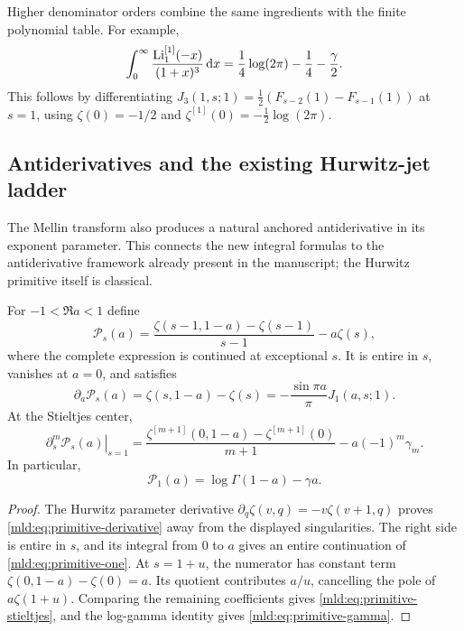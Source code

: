 Higher denominator orders combine the same ingredients with the finite polynomial table. For example,
\begin{equation}\label{mld:eq:third-pole-example}
 \int_0^\infty\frac{\operatorname{Li}_1^{[1]}(-x)}{(1+x)^3}\,\mathrm{d} x
       =\frac14\log(2\pi)-\frac14-\frac\gamma2.
\end{equation}
This follows by differentiating
$J_3(1,s;1)=\tfrac12(F_{s-2}(1)-F_{s-1}(1))$
at $s=1$, using $\zeta(0)=-1/2$ and
$\zeta^{[1]}(0)=-\tfrac12\log(2\pi)$.

\subsection{Antiderivatives and the existing Hurwitz-jet ladder}

The Mellin transform also produces a natural anchored antiderivative in its exponent parameter. This connects the new integral formulas to the antiderivative framework already present in the manuscript; the Hurwitz primitive itself is classical.

\begin{proposition}\label{mld:prop:primitive}
For $-1<\Re a<1$ define
\begin{equation}\label{mld:eq:primitive-one}
 \mathcal P_s(a)=
 \frac{\zeta(s-1,1-a)-\zeta(s-1)}{s-1}-a\zeta(s),
\end{equation}
where the complete expression is continued at exceptional $s$. It is entire in $s$, vanishes at $a=0$, and satisfies
\begin{equation}\label{mld:eq:primitive-derivative}
 \partial_a\mathcal P_s(a)
   =\zeta(s,1-a)-\zeta(s)
   =-\frac{\sin\pi a}{\pi}J_1(a,s;1).
\end{equation}
At the Stieltjes center,
\begin{equation}\label{mld:eq:primitive-stieltjes}
 \left.\partial_s^m\mathcal P_s(a)\right|_{s=1}
   =\frac{\zeta^{[m+1]}(0,1-a)-\zeta^{[m+1]}(0)}{m+1}
         -a(-1)^m\gamma_m.
\end{equation}
In particular,
\begin{equation}\label{mld:eq:primitive-gamma}
 \mathcal P_1(a)=\log\Gamma(1-a)-\gamma a.
\end{equation}
\end{proposition}
\begin{proof}
The Hurwitz parameter derivative
$\partial_q\zeta(v,q)=-v\zeta(v+1,q)$ proves
\eqref{mld:eq:primitive-derivative} away from the displayed singularities. The right side is entire in $s$, and its integral from $0$ to $a$ gives an entire continuation of \eqref{mld:eq:primitive-one}. At $s=1+u$, the numerator has constant term
$\zeta(0,1-a)-\zeta(0)=a$. Its quotient contributes $a/u$, cancelling the pole of $a\zeta(1+u)$. Comparing the remaining coefficients gives \eqref{mld:eq:primitive-stieltjes}, and the log-gamma identity gives \eqref{mld:eq:primitive-gamma}.
\end{proof}

